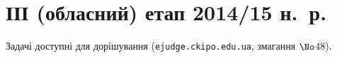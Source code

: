 
\section{ІІІ (обласний) етап 2014/15 н.~р.}

Задачі доступні для дорішування (\verb"ejudge.ckipo.edu.ua", змагання $\No$48).

\renewenvironment{problemAllDefault}[1]{\vspace{10mm}\par\begin{problem}{#1}{Клавіатура (stdin) або файл input.txt}{Екран (stdout) або файл output.txt}{1 сек}{64 мегабайти}}{\end{problem}}

	

	

	

	


